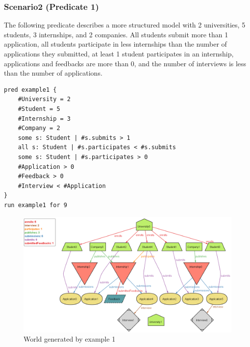 \subsubsection{Scenario2 (Predicate 1)}
The following predicate describes a more structured model with 2 universities, 5 students, 3 internships, and 2 companies.
All students submit more than 1 application, all students participate in less internships than the number of applications they submitted,
at least 1 student participates in an internship, applications and feedbacks are more than 0, and the number of interviews is less than the 
number of applications.
\begin{lstlisting}
pred example1 {
    #University = 2
    #Student = 5
    #Internship = 3
    #Company = 2
    some s: Student | #s.submits > 1
    all s: Student | #s.participates < #s.submits
    some s: Student | #s.participates > 0
    #Application > 0
    #Feedback > 0
    #Interview < #Application
} 
run example1 for 9
\end{lstlisting}
\begin{figure}[H]
    \centering
    \includegraphics[width=1\textwidth]{Images/Alloy/example1.png}
    \caption{World generated by example 1}\label{fig:example1}
\end{figure}

